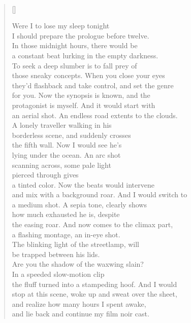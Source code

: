 \documentclass{book}
\begin{document}
\newpage
\poemtitle{\textcolor[RGB]{165,15,15}{Hyposomnia Hypothesis}}
\hspace*{\fill} \\
\settowidth{\versewidth}{an aerial shot. An endless road extents to the clouds.}
\begin{verse}[\versewidth]

    Were I to lose my sleep tonight \\
    I should prepare the prologue before twelve. \\
    In those midnight hours, there would be\\
    a constant beat lurking in the empty darkness. \\
    To seek a deep slumber is to fall prey of \\
    those sneaky concepts. When you close your eyes\\
    they'd flashback and take control, and set the genre\\
    for you. Now the synopsis is known, and the\\
    protagonist is myself. And it would start with\\
    an aerial shot. An endless road extents to the clouds.\\
    A lonely traveller walking in his\\
    borderless scene, and suddenly crosses\\
    the fifth wall. Now I would see he's\\
    lying under the ocean. An arc shot\\
    scanning across, some pale light\\
    pierced through gives \\
    a tinted color. Now the beats would intervene\\
    and mix with a background roar. And I would switch to\\
    a medium shot. A sepia tone, clearly shows\\
    how much exhausted he is, despite\\
    the easing roar. And now comes to the climax part,\\
    a flashing montage, an in-eye shot. \\
    The blinking light of the streetlamp, will \\
    be trapped between his lids. \\
    Are you the shadow of the waxwing slain? \\
    In a speeded slow-motion clip\\
    the fluff turned into a stampeding hoof. And I would\\
    stop at this scene, woke up and sweat over the sheet,\\
    and realize how many hours I spent awake,\\
    and lie back and continue my film noir cast.\\
\end{verse}
\end{document}
